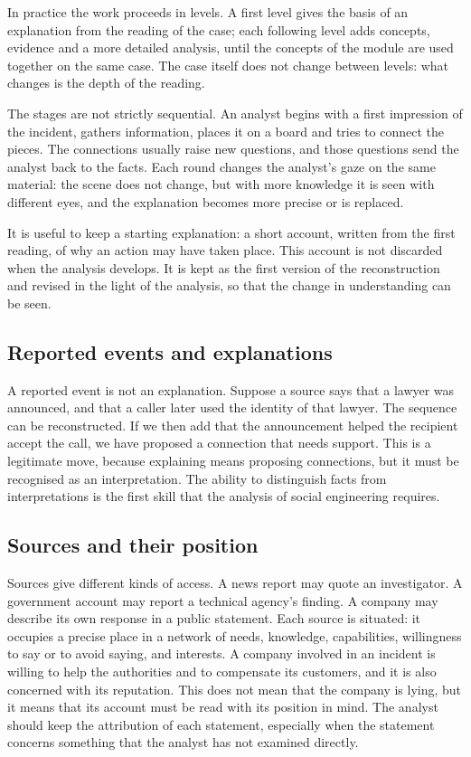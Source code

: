 In practice the work proceeds in levels. A first level gives the basis of an explanation from the reading of the case; each following level adds concepts, evidence and a more detailed analysis, until the concepts of the module are used together on the same case. The case itself does not change between levels: what changes is the depth of the reading.

The stages are not strictly sequential. An analyst begins with a first impression of the incident, gathers information, places it on a board and tries to connect the pieces. The connections usually raise new questions, and those questions send the analyst back to the facts. Each round changes the analyst's gaze on the same material: the scene does not change, but with more knowledge it is seen with different eyes, and the explanation becomes more precise or is replaced.

It is useful to keep a starting explanation: a short account, written from the first reading, of why an action may have taken place. This account is not discarded when the analysis develops. It is kept as the first version of the reconstruction and revised in the light of the analysis, so that the change in understanding can be seen.

\subsection{Reported events and explanations}
A reported event is not an explanation. Suppose a source says that a lawyer was announced, and that a caller later used the identity of that lawyer. The sequence can be reconstructed. If we then add that the announcement helped the recipient accept the call, we have proposed a connection that needs support. This is a legitimate move, because explaining means proposing connections, but it must be recognised as an interpretation. The ability to distinguish facts from interpretations is the first skill that the analysis of social engineering requires.

\subsection{Sources and their position}
Sources give different kinds of access. A news report may quote an investigator. A government account may report a technical agency's finding. A company may describe its own response in a public statement. Each source is situated: it occupies a precise place in a network of needs, knowledge, capabilities, willingness to say or to avoid saying, and interests. A company involved in an incident is willing to help the authorities and to compensate its customers, and it is also concerned with its reputation. This does not mean that the company is lying, but it means that its account must be read with its position in mind. The analyst should keep the attribution of each statement, especially when the statement concerns something that the analyst has not examined directly.

